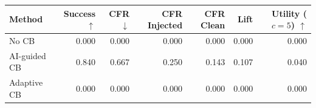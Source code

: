 \begin{tabular}{lrrrrrr}
\toprule
Method & Success $\uparrow$ & CFR $\downarrow$ & CFR Injected & CFR Clean & Lift & Utility ($c=5$) $\uparrow$ \\
\midrule
No CB & 0.000 & 0.000 & 0.000 & 0.000 & 0.000 & 0.000 \\
AI-guided CB & 0.840 & 0.667 & 0.250 & 0.143 & 0.107 & 0.040 \\
Adaptive CB & 0.000 & 0.000 & 0.000 & 0.000 & 0.000 & 0.000 \\
\bottomrule
\end{tabular}
